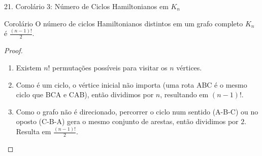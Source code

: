 \documentclass[9pt]{beamer}
\begin{document}
    \begin{frame}{21. Corolário 3: Número de Ciclos Hamiltonianos em $K_n$}
        \begin{block}{Corolário}
            O número de ciclos Hamiltonianos distintos em um grafo completo $K_n$ é $\frac{(n-1)!}{2}$.
        \end{block}
        \vspace{0.3cm}
        \begin{proof}
            \begin{enumerate}
                \item Existem $n!$ permutações possíveis para visitar os $n$ vértices.
                \item Como é um ciclo, o vértice inicial não importa (uma rota ABC é o mesmo ciclo que BCA e CAB), então dividimos por $n$, resultando em $(n-1)!$.
                \item Como o grafo não é direcionado, percorrer o ciclo num sentido (A-B-C) ou no oposto (C-B-A) gera o mesmo conjunto de arestas, então dividimos por $2$. Resulta em $\frac{(n-1)!}{2}$.
            \end{enumerate}
        \end{proof}
    \end{frame}
\end{document}
